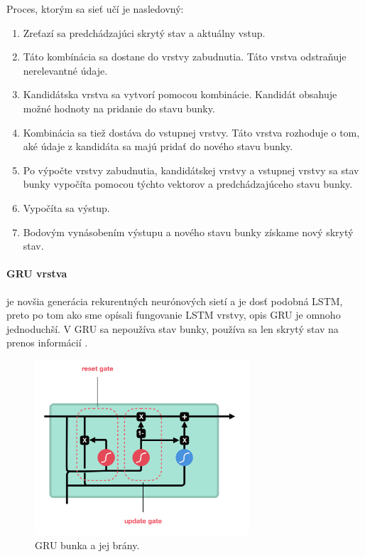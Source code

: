 Proces, ktorým sa sieť učí je nasledovný:
\begin{enumerate}
    \item Zreťazí sa predchádzajúci skrytý stav a aktuálny vstup.
    \item Táto kombínácia sa dostane do vrstvy zabudnutia. Táto vrstva odstraňuje nerelevantné údaje.
    \item Kandidátska vrstva sa vytvorí pomocou kombinácie. Kandidát obsahuje možné hodnoty na pridanie do stavu bunky.
    \item Kombinácia sa tiež dostáva do vstupnej vrstvy. Táto vrstva rozhoduje o tom, aké údaje z kandidáta sa majú pridať do nového stavu bunky.
    \item Po výpočte vrstvy zabudnutia, kandidátskej vrstvy a vstupnej vrstvy sa stav bunky vypočíta pomocou týchto vektorov a predchádzajúceho stavu bunky.
    \item Vypočíta sa výstup.
    \item Bodovým vynásobením výstupu a nového stavu bunky získame nový skrytý stav.
\end{enumerate}

\paragraph{GRU vrstva} je novšia generácia rekurentných neurónových sietí a je dosť podobná LSTM, preto po tom ako sme opísali fungovanie LSTM vrstvy, opis GRU je omnoho jednoduchší. V GRU sa nepoužíva stav bunky, používa sa len skrytý stav na prenos informácií \cite{gru}. 

\begin{figure}[!htbp]
  \centering
  \includegraphics[width=8cm]{img/gru.png}
  \caption{GRU bunka a jej brány.}
  \label{gru}
\end{figure}

